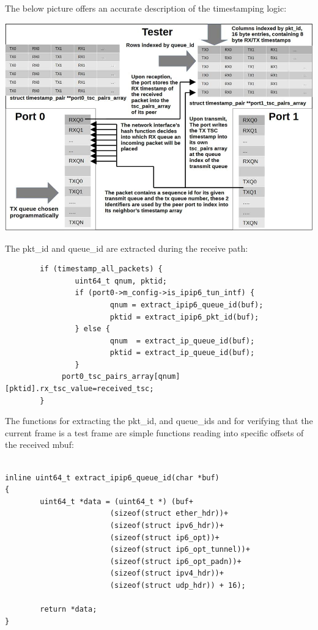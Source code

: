 \documentclass[a4paper,12p,titlepage]{article}
\begin{document}
The below picture offers an accurate description of the timestamping logic:

\includegraphics[width=\textwidth]{6transperfarchitecture}


The pkt\_id and queue\_id are extracted during the receive path:

\begin{frame}

\lstset{language=C++,breaklines=true,numbers=left}
\begin{lstlisting}
        if (timestamp_all_packets) {
                uint64_t qnum, pktid;
                if (port0->m_config->is_ipip6_tun_intf) {
                        qnum = extract_ipip6_queue_id(buf);
                        pktid = extract_ipip6_pkt_id(buf);
                } else {
                        qnum  = extract_ip_queue_id(buf);
                        pktid = extract_ip_queue_id(buf);
                }
             port0_tsc_pairs_array[qnum][pktid].rx_tsc_value=received_tsc;
        }
\end{lstlisting}
\end{frame}

The functions for extracting the pkt\_id, and queue\_ids and for verifying that the current frame is a test frame are simple functions reading into specific offsets of the received mbuf:

\begin{frame}

\lstset{language=C++,breaklines=true,numbers=left}
\begin{lstlisting}

inline uint64_t extract_ipip6_queue_id(char *buf)
{
        uint64_t *data = (uint64_t *) (buf+
                        (sizeof(struct ether_hdr))+
                        (sizeof(struct ipv6_hdr))+
                        (sizeof(struct ip6_opt))+
                        (sizeof(struct ip6_opt_tunnel))+
                        (sizeof(struct ip6_opt_padn))+
                        (sizeof(struct ipv4_hdr))+
                        (sizeof(struct udp_hdr)) + 16);

        return *data;
}

\end{lstlisting}
\end{frame}
\end{document}
